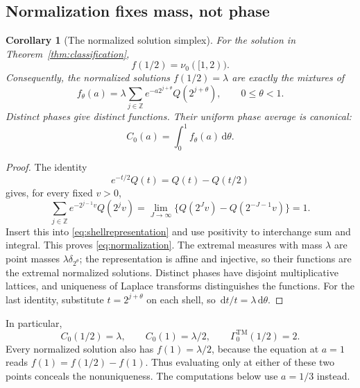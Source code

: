 \documentclass[11pt,letterpaper]{article}
\numberwithin{equation}{section}
\newtheorem{corollary}[theorem]{Corollary}
\theoremstyle{definition}
\theoremstyle{remark}
\newcommand{\Z}{\mathbb Z}
\newcommand{\dd}{\,\mathrm d}
\begin{document}
\subsection{Normalization fixes mass, not phase}
\begin{corollary}[The normalized solution simplex]\label{cor:normalization}
For the solution in Theorem~\ref{thm:classification},
\begin{equation}\label{eq:normalization}
 f(1/2)=\nu_0([1,2)).
\end{equation}
Consequently, the normalized solutions $f(1/2)=\lambda$ are exactly the
mixtures of
\begin{equation}\label{eq:phasefunctions}
 f_\theta(a)=\lambda\sum_{j\in\Z}
      e^{-a2^{j+\theta}}Q(2^{j+\theta}),\qquad 0\le\theta<1.
\end{equation}
Distinct phases give distinct functions. Their uniform phase average is
canonical:
\begin{equation}\label{eq:canonicalaverage}
 C_0(a)=\int_0^1 f_\theta(a)\dd\theta.
\end{equation}
\end{corollary}
\begin{proof}
The identity
\begin{equation}\label{eq:telescoper}
 e^{-t/2}Q(t)=Q(t)-Q(t/2)
\end{equation}
gives, for every fixed $v>0$,
\[
 \sum_{j\in\Z}e^{-2^{j-1}v}Q(2^jv)
 =\lim_{J\to\infty}\{Q(2^Jv)-Q(2^{-J-1}v)\}=1.
\]
Insert this into \eqref{eq:shellrepresentation} and use positivity to
interchange sum and integral. This proves \eqref{eq:normalization}.
The extremal measures with mass $\lambda$ are point masses
$\lambda\delta_{2^\theta}$; the representation is affine and injective,
so their functions are the extremal normalized solutions.
Distinct phases have disjoint multiplicative lattices, and uniqueness of
Laplace transforms distinguishes the functions.
For the last identity, substitute $t=2^{j+\theta}$ on each shell, so
$\dd t/t=\lambda\dd\theta$.
\end{proof}

In particular,
\begin{equation}\label{eq:canonicalnorms}
 C_0(1/2)=\lambda,\qquad C_0(1)=\lambda/2,
 \qquad\Gamma_0^{\mathrm{TM}}(1/2)=2.
\end{equation}
Every normalized solution also has $f(1)=\lambda/2$, because the equation
at $a=1$ reads $f(1)=f(1/2)-f(1)$.
Thus evaluating only at either of these two points conceals the
nonuniqueness. The computations below use $a=1/3$ instead.
\end{document}
